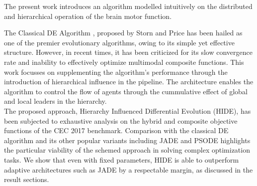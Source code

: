 \documentclass[a4paper,twoside]{article}
\begin{document}
The present work introduces an algorithm modelled intuitively on the distributed and hierarchical operation of the brain motor function.     

The Classical DE Algorithm \cite{storn1995differential}, proposed by Storn and Price has been hailed as one of the premier evolutionary algorithms, owing to its simple yet effective structure\cite{das2011differential}. However, in recent times, it has been criticized for its slow convergence rate and inability to effectively optimize multimodal composite functions\cite{das2011differential}. This work focusses on supplementing the algorithm's performance through the introduction of hierarchical influence in the pipeline. The architecture enables the algorithm to control the flow of agents through the cummulative effect of global and local leaders in the hierarchy. \\
The proposed approach, Hierarchy Influenced Differential Evolution (HIDE), has been subjected to exhaustive analysis on the hybrid and composite objective functions of the CEC 2017 benchmark\cite{cec2017benchmark}. Comparison with the classical DE algorithm and its other popular variants including JADE and PSODE \cite{zhang2009jade} highlights the particular viability of the schemed approach in solving complex optimization tasks. We show that even with fixed parameters, HIDE is able to outperform adaptive architectures such as JADE by a respectable margin, as discussed in the result sections.





\end{document}
